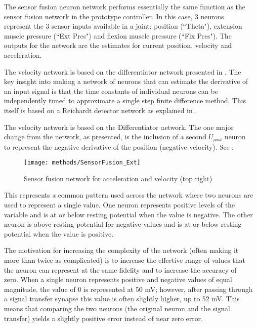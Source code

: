 
The sensor fusion neuron network performs essentially the same function as the
sensor fusion network in the prototype controller. In this case, 3 neurons
represent the 3 sensor inputs available in a joint: position (``Theta"),
extension muscle pressure (``Ext Pres") and flexion muscle pressure
(``Flx Pres"). The outputs for the network are the estimates for current 
position, velocity and acceleration.



The velocity network is based on the differentiator network presented in 
\cite{NickFunctionalSubnetwork}. The key insight into making a network
of neurons that can estimate the derivative of an input signal is that
the time constants of individual neurons can be independently tuned to 
approximate a single step finite difference method. This itself is based
on a Reichardt detector network as explained in
\cite{NickFunctionalSubnetwork}.


The velocity network is based on the Differentiator network. 
The one major change from the network,
as presented, is the inclusion of a second $U_{post}$ neuron to 
represent the negative derivative of the position (negative velocity). See .

\begin{figure}
\centering
\texttt{[image: methods/SensorFusion\_Ext]}
\caption{Sensor fusion network for acceleration and velocity (top right)}
\label{fig:SensorFusion}
\end{figure}

This represents
a common pattern used across the network where two neurons are used to represent
a single value. One neuron represents positive levels of the variable and is 
at or below resting potential when the value is negative. The other neuron is
above resting potential for negative values and is at or below resting potential
when the value is positive. 

The motivation for increasing the complexity of the
network (often making it more than twice as complicated) is to increase the
effective range of values that the neuron can represent at the same fidelity and
to increase the accuracy of zero. When a single neuron represents positive and
negative values of equal magnitude, the value of 0 is represented at 50 mV; 
however, after passing through a signal transfer synapse this value is often
slightly higher, up to 52 mV. This means that comparing the two neurons (the
original neuron and the signal transfer) yields a slightly positive error
instead of near zero error.

